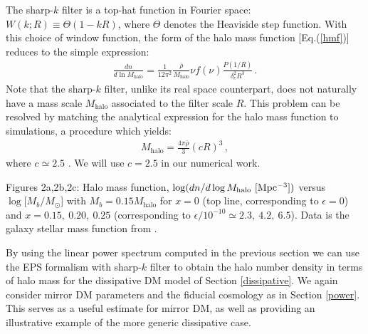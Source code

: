 \documentclass[12pt]{article}
\begin{document}
The sharp-$k$ filter is a top-hat function in Fourier space: $W(k;R) \equiv \Theta (1 - kR)$,  where $\Theta$ denotes the Heaviside step function. With this choice of window function, the form of the halo mass function [Eq.(\ref{hmf})]  reduces to the simple expression:
%
\begin{eqnarray}
\frac{dn}{d\ln M_{\text{halo}}} = \frac{1}{12\pi ^2}\frac{\bar{\rho}}{M_{\text{halo}}}\nu f(\nu)\frac{P(1/R)}{\delta _c ^2R ^3} \, .
\label{hmfnew}
\end{eqnarray}
%
Note that the sharp-$k$ filter, unlike its real space counterpart, does not naturally have a mass scale $M_{\text{halo}}$ associated to the filter scale $R$. This problem can be resolved by matching the analytical expression for the halo mass function to simulations, a procedure which yields: 
%
\begin{eqnarray}
M_{\text{halo}} = \frac{4\pi \bar{\rho}}{3}(cR) ^3 \, ,
\label{mass}
\end{eqnarray}
%
where $c \simeq 2.5$ \cite{s13,schneider}. We will use $c = 2.5$ in our numerical work.



\centerline{}
\vskip 0.1cm
\centerline{}
\vskip 0.1cm
\centerline{}
\vskip 0.2cm
\noindent
{\small Figures 2a,2b,2c: Halo mass function, $\log(dn/d \log M_{\text{halo}} \ [\rm Mpc^{-3}])$  versus $\log [M_{b}/M_\odot$] 
with $M_b = 0.15M_{\text{halo}}$ for $x=0$ (top line, corresponding to $\epsilon = 0$) and $x=0.15,\ 0.20,\ 0.25$ 
(corresponding to $\epsilon/10^{-10} \simeq 2.3, \ 4.2,  \ 6.5$). Data is the galaxy stellar mass function from \cite{bell}. 
} 
\vskip 0.3cm



By using the linear power spectrum computed in the previous section we can use the EPS formalism with sharp-$k$ filter to 
obtain the halo number density in terms of halo mass for the dissipative DM model of Section \ref{dissipative}. We again consider 
mirror DM parameters and the fiducial cosmology as in Section \ref{power}. This serves as a useful 
estimate for mirror DM, as well as providing an illustrative example of the more generic dissipative case.
\end{document}

